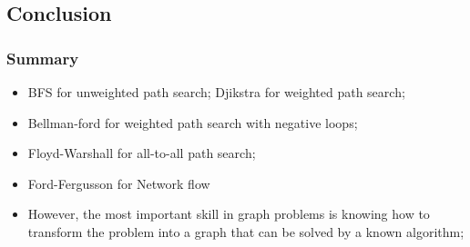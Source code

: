 \subsection{Conclusion}
\begin{frame}
  \frametitle{Summary}
  \begin{itemize}
  \item BFS for unweighted path search; Djikstra for weighted path search;
  \item Bellman-ford for weighted path search with negative loops;
  \item Floyd-Warshall for all-to-all path search;
  \item Ford-Fergusson for Network flow

    \bigskip

  \item However, the most important skill in graph problems is knowing
    how to transform the problem into a graph that can be solved by a
    known algorithm;
  \end{itemize}
\end{frame}
